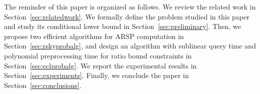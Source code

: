 The reminder of this paper is organized as follows.
We review the related work in Section~\ref{sec:relatedwork}.
We formally define the problem studied in this paper and study its conditional lower bound in Section~\ref{sec:preliminary}.
Then, we propose two efficient algorithms for ARSP computation in Section~\ref{sec:rskyprobalg}, and design an algorithm with sublinear query time and polynomial preprocessing time for ratio bound constraints in Section~\ref{sec:eclprobalg}.
We report the experimental results in Section~\ref{sec:experiments}.
Finally, we conclude the paper in Section~\ref{sec:conclusions}.
